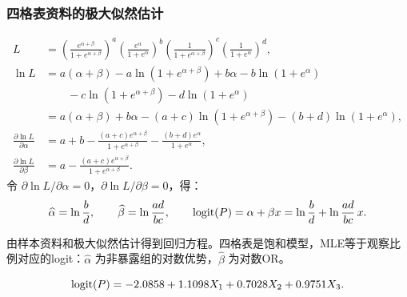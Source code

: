 \subsubsection{四格表资料的极大似然估计}
\begin{align*}
L&=\left(\frac{e^{\alpha+\beta}}{1+e^{\alpha+\beta}}\right)^a
\left(\frac{e^\alpha}{1+e^\alpha}\right)^b
\left(\frac1{1+e^{\alpha+\beta}}\right)^c
\left(\frac1{1+e^\alpha}\right)^d,\\
\ln L&=a(\alpha+\beta)-a\ln(1+e^{\alpha+\beta})+b\alpha-b\ln(1+e^\alpha)\\
&\qquad-c\ln(1+e^{\alpha+\beta})-d\ln(1+e^\alpha)\\
&=a(\alpha+\beta)+b\alpha-(a+c)\ln(1+e^{\alpha+\beta})-(b+d)\ln(1+e^\alpha),\\
\frac{\partial\ln L}{\partial\alpha}&=a+b-\frac{(a+c)e^{\alpha+\beta}}{1+e^{\alpha+\beta}}-\frac{(b+d)e^\alpha}{1+e^\alpha},\\
\frac{\partial\ln L}{\partial\beta}&=a-\frac{(a+c)e^{\alpha+\beta}}{1+e^{\alpha+\beta}}.
\end{align*}
令 $\partial\ln L/\partial\alpha=0$，$\partial\ln L/\partial\beta=0$，得：
\[
\widehat\alpha=\ln\frac bd,\qquad \widehat\beta=\ln\frac{ad}{bc},\qquad
\operatorname{logit}(P)=\alpha+\beta x=\ln\frac bd+\ln\frac{ad}{bc}\,x.
\]

\begin{annotation}由样本资料和极大似然估计得到回归方程。四格表是饱和模型，MLE等于观察比例对应的logit：$\widehat\alpha$ 为非暴露组的对数优势，$\widehat\beta$ 为对数OR。\end{annotation}
\[
\operatorname{logit}(P)=-2.0858+1.1098X_1+0.7028X_2+0.9751X_3.
\]
